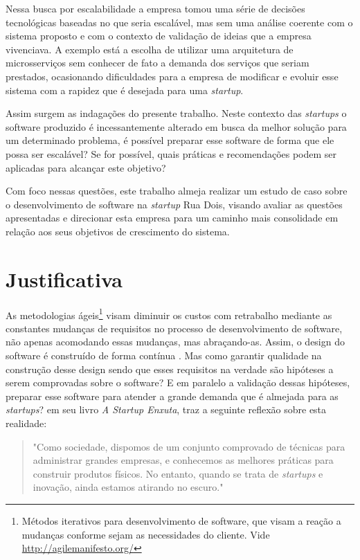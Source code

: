 Nessa busca por escalabilidade a empresa tomou uma série de decisões tecnológicas
baseadas no que seria escalável, mas sem uma análise coerente com o sistema
proposto e com o contexto de validação de ideias que a empresa vivenciava.
A exemplo está a escolha de utilizar uma arquitetura de microsserviços sem conhecer
de fato a demanda dos serviços que seriam prestados, ocasionando dificuldades para
a empresa de modificar e evoluir esse sistema com a rapidez que é desejada para uma
\textit{startup}.

Assim surgem as indagações do presente trabalho. Neste contexto das \textit{startups}
o software produzido é incessantemente alterado em busca da melhor solução para um
determinado problema, é possível preparar esse software de forma que ele possa ser
escalável? Se for possível, quais práticas e recomendações podem ser aplicadas para
alcançar este objetivo?

Com foco nessas questões, este trabalho almeja realizar um estudo de caso sobre o
desenvolvimento de software na \textit{startup} Rua Dois, visando avaliar as questões
apresentadas e direcionar esta empresa para um caminho mais consolidade em relação
aos seus objetivos de crescimento do sistema.

\section{Justificativa}

As metodologias ágeis\footnote{Métodos iterativos para desenvolvimento de software,
que visam a reação a mudanças conforme sejam as necessidades do cliente. Vide
\url{http://agilemanifesto.org/}} visam diminuir os custos com retrabalho mediante as
constantes mudanças de requisitos no processo de desenvolvimento de software,
não apenas acomodando essas mudanças, mas abraçando-as. Assim, o design do
software é construído de forma contínua \cite{AgileSoftwareInnovation}.
Mas como garantir qualidade na construção desse design sendo que esses requisitos
na verdade são hipóteses a serem comprovadas sobre o software? E em paralelo
a validação dessas hipóteses, preparar esse software para atender a grande
demanda que é almejada para as \textit{startups}? 
em seu livro \textit{A Startup Enxuta}, traz a seguinte reflexão sobre esta
realidade:

  \begin{quotation}
    "Como sociedade, dispomos de um conjunto comprovado de técnicas para
    administrar grandes empresas, e conhecemos as melhores práticas para
    construir produtos físicos. No entanto, quando se trata de \textit{startups}
    e inovação, ainda estamos atirando no escuro."
  \end{quotation}

